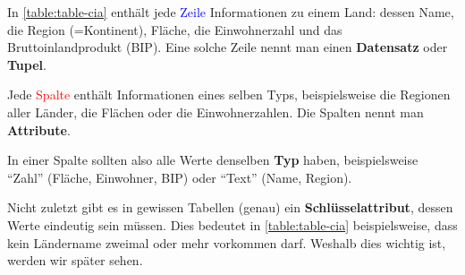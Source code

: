 \begin{table}[H]
  \centering
  \tiny
  \caption{Typische Tabellenstruktur anhand einer Tabelle mit Informationen zu Ländern}
  \label{table:table-cia}
\end{table}
In \cref{table:table-cia} enthält jede \textcolor{blue}{Zeile} Informationen zu einem Land: dessen Name, die Region (=Kontinent), Fläche, die Einwohnerzahl und das Bruttoinlandprodukt (BIP). Eine solche Zeile nennt man  einen \textbf{Datensatz} oder \textbf{Tupel}.

Jede \textcolor{red}{Spalte} enthält Informationen eines selben Typs, beispielsweise die Regionen aller Länder, die Flächen oder die Einwohnerzahlen. Die Spalten nennt man \textbf{Attribute}.

In einer Spalte sollten also alle Werte denselben \textbf{Typ} haben, beispielsweise \enquote{Zahl} (Fläche, Einwohner, BIP) oder
\enquote{Text} (Name, Region). 

Nicht zuletzt gibt es in gewissen Tabellen (genau) ein \textbf{Schlüsselattribut}, dessen Werte eindeutig sein müssen. 
Dies bedeutet in \cref{table:table-cia} beispielsweise, dass kein Ländername zweimal oder mehr vorkommen darf. Weshalb dies wichtig ist, werden wir später sehen.

